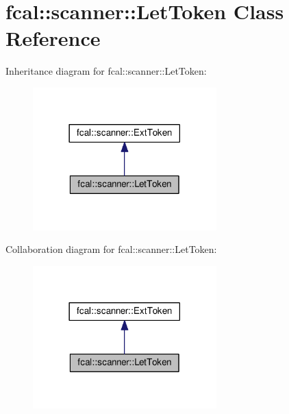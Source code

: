 \hypertarget{classfcal_1_1scanner_1_1LetToken}{}\section{fcal\+:\+:scanner\+:\+:Let\+Token Class Reference}
\label{classfcal_1_1scanner_1_1LetToken}


Inheritance diagram for fcal\+:\+:scanner\+:\+:Let\+Token\+:
\nopagebreak
\begin{figure}[H]
\begin{center}
\leavevmode
\includegraphics[width=201pt]{classfcal_1_1scanner_1_1LetToken__inherit__graph}
\end{center}
\end{figure}


Collaboration diagram for fcal\+:\+:scanner\+:\+:Let\+Token\+:
\nopagebreak
\begin{figure}[H]
\begin{center}
\leavevmode
\includegraphics[width=201pt]{classfcal_1_1scanner_1_1LetToken__coll__graph}
\end{center}
\end{figure}
